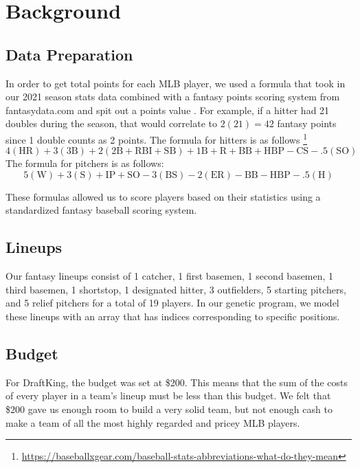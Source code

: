 
\section{Background}
\label{sec:background}

\subsection{Data Preparation}
\label{subsec:enum}
In order to get total points for each MLB player, we used a formula that took in our 2021 season stats data combined with a fantasy points scoring system from fantasydata.com and spit out a points value \cite{pointsSystem}. For example, if a hitter had 21 doubles during the season, that would correlate to $2(21) = 42$ fantasy points since 1 double counts as 2 points. The formula for hitters is as follows \footnote{\url{https://baseballxgear.com/baseball-stats-abbreviations-what-do-they-mean}}
$$4(\text{HR}) + 3(\text{3B}) + 2(\text{2B} + \text{RBI} + \text{SB}) + \text{1B} + \text{R} + \text{BB} + \text{HBP}  - \text{CS} - .5(\text{SO})$$
The formula for pitchers is as follows:
$$5(\text{W}) + 3(\text{S}) + \text{IP} + \text{SO} - 3(\text{BS}) -  2(\text{ER}) - \text{BB} -  \text{HBP} - .5(\text{H})$$

These formulas allowed us to score players based on their statistics using a standardized fantasy baseball scoring system. 


\subsection{Lineups}
\label{subsec:enum}
Our fantasy lineups consist of 1 catcher, 1 first basemen, 1 second basemen, 1 third basemen, 1 shortstop, 1 designated hitter, 3 outfielders, 5 starting pitchers, and 5 relief pitchers for a total of 19 players. In our genetic program, we model these lineups with an array that has indices corresponding to specific positions. 

\subsection{Budget}
\label{subsec:enum}
For DraftKing, the budget was set at \$200. This means that the sum of the costs of every player in a team's lineup must be less than this budget. We felt that \$200 gave us enough room to build a very solid team, but not enough cash to make a team of all the most highly regarded and pricey MLB players. 

